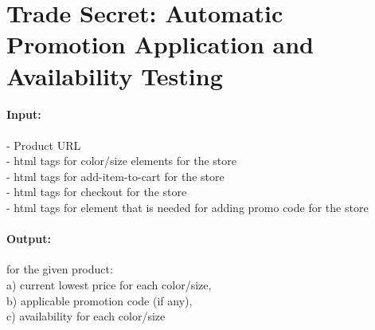\documentclass[11pt]{article}
\begin{document}



\section{Trade Secret: Automatic Promotion Application and Availability Testing}

\paragraph{Input:} 
- Product URL\\ 
- html tags for color/size elements for the store\\ 
- html tags for add-item-to-cart for the store\\
- html tags for checkout for the store\\
- html tags for element that is needed for adding promo code for the store\\

\paragraph{Output:} for the given product:\\
a) current lowest price for each color/size,\\
b) applicable promotion code (if any),\\
c) availability for each color/size
 
\end{document}
